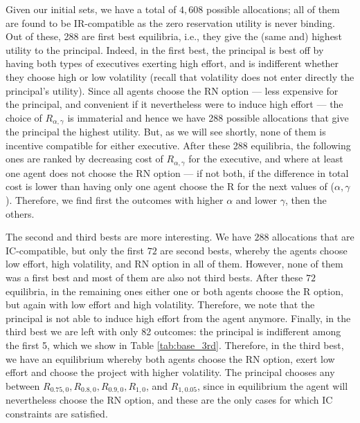 Given our initial sets, we have a total of $4,608$ possible allocations; all of them are found to be IR-compatible as the zero reservation utility is never binding. Out of these, 288 are first best equilibria, i.e., they give the (same and) highest utility to the principal. Indeed, in the first best, the principal is best off by having both types of executives exerting high effort, and is indifferent whether they choose high or low volatility (recall that volatility does not enter directly the principal's utility). Since all agents choose the RN option --- less expensive for the principal, and convenient if it nevertheless were to induce high effort --- the choice of $R_{\alpha, \gamma}$ is immaterial and hence we have 288 possible allocations that give the principal the highest utility. But, as we will see shortly, none of them is incentive compatible for either executive. After these 288 equilibria, the following ones are ranked by decreasing cost of $R_{\alpha, \gamma}$ for the executive, and where at least one agent does not choose the RN option --- if not both, if the difference in total cost is lower than having only one agent choose the R for the next values of ($\alpha, \gamma$). Therefore, we find first the outcomes with higher $\alpha$ and lower $\gamma$, then the others.



The second and third bests are more interesting. We have $288$ allocations that are IC-compatible, but only the first $72$ are second bests, whereby the agents choose low effort, high volatility, and RN option in all of them. However, none of them was a first best and most of them are also not third bests. After these $72$ equilibria, in the remaining ones either one or both agents choose the R option, but again with low effort and high volatility. Therefore, we note that the principal is not able to induce high effort from the agent anymore. Finally, in the third best we are left with only 82 outcomes: the principal is indifferent among the first 5, which we show in Table \ref*{tab:base_3rd}. Therefore, in the third best, we have an equilibrium whereby both agents choose the RN option, exert low effort and choose the project with higher volatility. The principal chooses any between $R_{0.75, 0}, R_{0.8, 0}, R_{0.9, 0}, R_{1, 0}$, and $R_{1, 0.05}$, since in equilibrium the agent will nevertheless choose the RN option, and these are the only cases for which IC constraints are satisfied.



